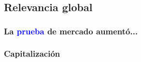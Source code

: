 \subsection{Relevancia global}

\begin{frame}
\frametitle<1,2>{La \textcolor{blue}{prueba} de mercado aumentó...}


          
\end{frame}

\subsubsection{Capitalización}

